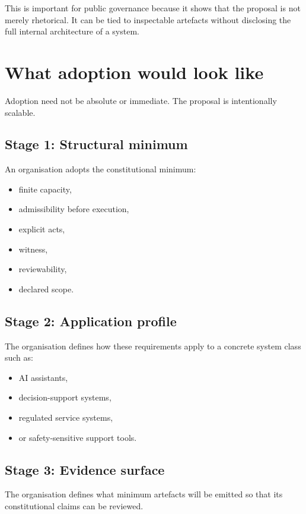 \documentclass[11pt]{article}
\begin{document}
This is important for public governance because it shows that the proposal is not merely rhetorical. It can be tied to inspectable artefacts without disclosing the full internal architecture of a system.

\section{What adoption would look like}

Adoption need not be absolute or immediate. The proposal is intentionally scalable.

\subsection*{Stage 1: Structural minimum}
An organisation adopts the constitutional minimum:
\begin{itemize}[leftmargin=2em]
    \item finite capacity,
    \item admissibility before execution,
    \item explicit acts,
    \item witness,
    \item reviewability,
    \item declared scope.
\end{itemize}

\subsection*{Stage 2: Application profile}
The organisation defines how these requirements apply to a concrete system class such as:
\begin{itemize}[leftmargin=2em]
    \item AI assistants,
    \item decision-support systems,
    \item regulated service systems,
    \item or safety-sensitive support tools.
\end{itemize}

\subsection*{Stage 3: Evidence surface}
The organisation defines what minimum artefacts will be emitted so that its constitutional claims can be reviewed.
\end{document}
